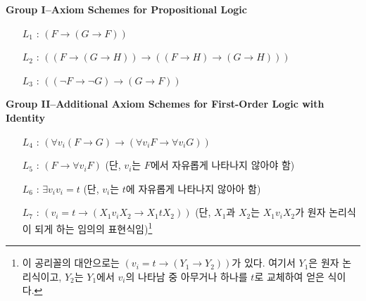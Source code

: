 \documentclass[12pt]{paper}
\begin{document}
  \noindent \textbf{Group I--Axiom Schemes for Propositional Logic}
  \begin{enumerate}
    \item[$L_{1}$ :] $\left( F \rightarrow \left( G \rightarrow F \right) \right)$
    \item[$L_{2}$ :] $\left( \left( F \rightarrow \left( G \rightarrow H \right) \right) \rightarrow \left( \left( F \rightarrow H \right) \rightarrow \left( G \rightarrow H \right) \right) \right)$
    \item[$L_{3}$ :] $\left( \left( \lnot F \rightarrow \lnot G \right) \rightarrow \left( G \rightarrow F \right) \right)$
  \end{enumerate}

  \noindent \textbf{Group II--Additional Axiom Schemes for First-Order Logic with Identity}
  \begin{enumerate}
    \item[$L_{4}$ :] $\left( \forall v_i \left( F \rightarrow G \right) \rightarrow \left( \forall v_i F \rightarrow \forall v_i G \right) \right)$
    \item[$L_{5}$ :] $\left( F \rightarrow \forall v_i F \right)$ (단, $v_i$는 $F$에서 자유롭게 나타나지 않아야 함)
    \item[$L_{6}$ :] $\exists v_i v_i = t$ (단, $v_i$는 $t$에 자유롭게 나타나지 않아아 함)
    \item[$L_{7}$ :] $\left( v_i = t \rightarrow \left( X_1 v_i X_2 \rightarrow X_1 t X_2 \right) \right)$ (단, $X_1$과 $X_2$는 $X_1 v_i X_2$가 원자 논리식이 되게 하는 임의의 표현식임)\footnote
    {
      이 공리꼴의 대안으로는 $\left( v_i = t \rightarrow \left( Y_1 \rightarrow Y_2 \right) \right)$가 있다.
      여기서 $Y_1$은 원자 논리식이고, $Y_2$는 $Y_1$에서 $v_i$의 나타남 중 아무거나 하나를 $t$로 교체하여 얻은 식이다.
    }
  \end{enumerate}
\end{document}
